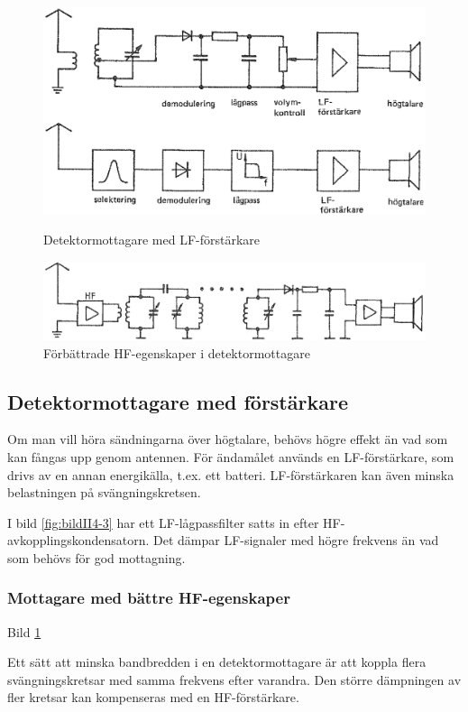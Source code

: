 \begin{figure}
  \includegraphics[width=\textwidth]{images/cropped_pdfs/bild_2_4-03.pdf}
  \caption{Detektormottagare med LF-förstärkare}
  \label{fig:bildII4-3}

  \includegraphics[width=\textwidth]{images/cropped_pdfs/bild_2_4-05.pdf}
  \caption{Förbättrade HF-egenskaper i detektormottagare}
  \label{fig:bildII4-5}
\end{figure}

\subsection{Detektormottagare med förstärkare}

Om man vill höra sändningarna över högtalare, behövs högre effekt än
vad som kan fångas upp genom antennen.
För ändamålet används en LF-förstärkare, som drivs av en annan energikälla,
t.ex. ett batteri.
LF-förstärkaren kan även minska belastningen på svängningskretsen.

I bild \ref{fig:bildII4-3} har ett LF-lågpassfilter satts in efter
HF-avkopplingskondensatorn.
Det dämpar LF-signaler med högre frekvens än vad som behövs för god mottagning.

\subsubsection{Mottagare med bättre HF-egenskaper}

Bild \ref{fig:bildII4-5}

Ett sätt att minska bandbredden i en detektormottagare är att koppla
flera svängningskretsar med samma frekvens efter varandra.
Den större dämpningen av fler kretsar kan kompenseras med en HF-förstärkare.

